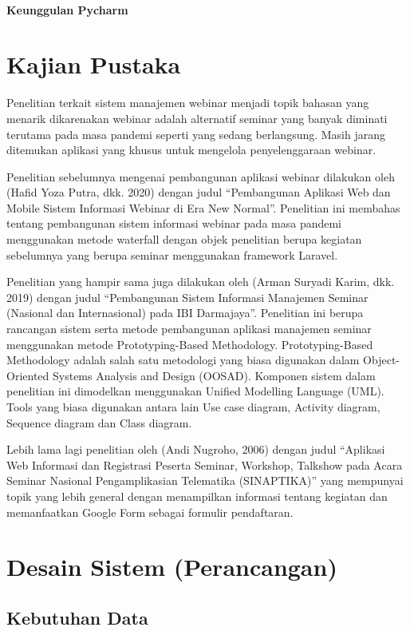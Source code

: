 \paragraph{Keunggulan Pycharm}


\section{Kajian Pustaka}
Penelitian terkait sistem manajemen webinar menjadi topik bahasan yang menarik dikarenakan webinar adalah alternatif seminar yang banyak diminati terutama pada masa pandemi seperti yang sedang berlangsung. Masih jarang ditemukan aplikasi yang khusus untuk mengelola penyelenggaraan webinar.

Penelitian sebelumnya mengenai pembangunan aplikasi webinar dilakukan oleh (Hafid Yoza Putra, dkk. 2020) dengan judul “Pembangunan Aplikasi Web dan Mobile Sistem Informasi Webinar di Era New Normal”. Penelitian ini membahas tentang pembangunan sistem informasi webinar pada masa pandemi menggunakan metode waterfall dengan objek penelitian berupa kegiatan sebelumnya yang berupa seminar menggunakan framework Laravel.

Penelitian yang hampir sama juga dilakukan oleh (Arman Suryadi Karim, dkk. 2019) dengan judul “Pembangunan Sistem Informasi Manajemen Seminar (Nasional dan Internasional) pada IBI Darmajaya”. Penelitian ini berupa rancangan sistem serta metode pembangunan aplikasi manajemen seminar menggunakan metode Prototyping-Based Methodology. Prototyping-Based Methodology adalah salah satu metodologi yang biasa digunakan dalam Object-Oriented Systems Analysis and Design (OOSAD). Komponen sistem dalam penelitian ini dimodelkan menggunakan Unified Modelling Language (UML). Tools yang biasa digunakan antara lain Use case diagram, Activity diagram, Sequence diagram dan Class diagram.

Lebih lama lagi penelitian oleh (Andi Nugroho, 2006) dengan judul “Aplikasi Web Informasi dan Registrasi Peserta Seminar, Workshop, Talkshow pada Acara Seminar Nasional Pengamplikasian Telematika (SINAPTIKA)” yang mempunyai topik yang lebih general dengan menampilkan informasi tentang kegiatan dan memanfaatkan Google Form sebagai formulir pendaftaran.


\section{Desain Sistem (Perancangan)}

\subsection{Kebutuhan Data}
